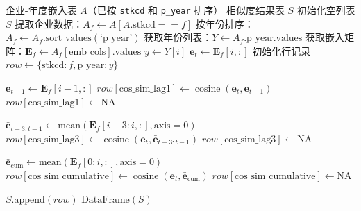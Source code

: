 \documentclass[12pt,a4paper]{article}
\theoremstyle{definition}
\newcommand{\vect}[1]{\mathbf{#1}}
\newcommand{\mat}[1]{\mathbf{#1}}
\DeclareMathOperator{\cosine}{cosine}
\begin{document}
\begin{algorithm}[H]
    \caption{计算企业年度相似度}
    \label{alg:similarity}
    \begin{algorithmic}[1]
        \Require 企业-年度嵌入表 $A$（已按 \texttt{stkcd} 和 \texttt{p\_year} 排序）
        \Ensure 相似度结果表 $S$
        \State 初始化空列表 $S$
            \State 提取企业数据：$A_f \leftarrow A[A.\text{stkcd} == f]$
            \State 按年份排序：$A_f \leftarrow A_f.\text{sort\_values}(\text{`p\_year'})$
            \State 获取年份列表：$Y \leftarrow A_f.\text{p\_year}.\text{values}$
            \State 获取嵌入矩阵：$\mat{E}_f \leftarrow A_f[\text{emb\_cols}].\text{values}$
                \State $y \leftarrow Y[i]$
                \State $\vect{e}_t \leftarrow \mat{E}_f[i, :]$ 
                \State 初始化行记录 $row \leftarrow \{\text{stkcd}: f, \text{p\_year}: y\}$
                
                \State {}
                    \State $\vect{e}_{t-1} \leftarrow \mat{E}_f[i-1, :]$
                    \State $row[\text{cos\_sim\_lag1}] \leftarrow \cosine(\vect{e}_t, \vect{e}_{t-1})$
                \Else
                    \State $row[\text{cos\_sim\_lag1}] \leftarrow \text{NA}$
                \EndIf
                
                \State {}
                    \State $\bar{\vect{e}}_{t-3:t-1} \leftarrow \text{mean}(\mat{E}_f[i-3:i, :], \text{axis}=0)$
                    \State $row[\text{cos\_sim\_lag3}] \leftarrow \cosine(\vect{e}_t, \bar{\vect{e}}_{t-3:t-1})$
                \Else
                    \State $row[\text{cos\_sim\_lag3}] \leftarrow \text{NA}$
                \EndIf
                
                \State {}
                    \State $\bar{\vect{e}}_{\text{cum}} \leftarrow \text{mean}(\mat{E}_f[0:i, :], \text{axis}=0)$
                    \State $row[\text{cos\_sim\_cumulative}] \leftarrow \cosine(\vect{e}_t, \bar{\vect{e}}_{\text{cum}})$
                \Else
                    \State $row[\text{cos\_sim\_cumulative}] \leftarrow \text{NA}$
                \EndIf
                
                \State $S.\text{append}(row)$
            \EndFor
        \EndFor
        \State \Return $\text{DataFrame}(S)$
    \end{algorithmic}
\end{algorithm}
\end{document}
